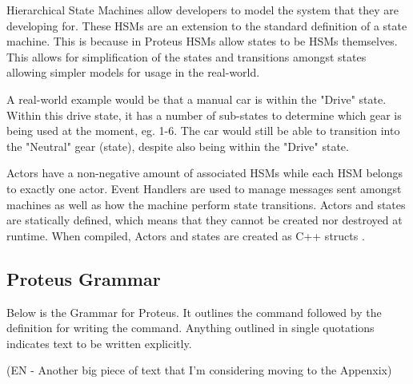 Hierarchical State Machines allow developers to model the system that they are developing for.
These HSMs are an extension to the standard definition of a state machine.
This is because in Proteus HSMs allow states to be HSMs themselves.
This allows for simplification of the states and transitions amongst states allowing simpler models for usage in the real-world.

A real-world example would be that a manual car is within the "Drive" state.
Within this drive state, it has a number of sub-states to determine which gear is being used at the moment, eg. 1-6.
The car would still be able to transition into the "Neutral" gear (state), despite also being within the "Drive" state.

Actors have a non-negative amount of associated HSMs while each HSM belongs to exactly one actor.
Event Handlers are used to manage messages sent amongst machines as well as how the machine perform state transitions.
Actors and states are statically defined, which means that they cannot be created nor destroyed at runtime.
When compiled, Actors and states are created as C++ structs \cite{ProteusRunTime}.

\subsection{Proteus Grammar}\label{subsec:ProteusGrammar}

Below is the Grammar for Proteus.
It outlines the command followed by the definition for writing the command.
Anything outlined in single quotations indicates text to be written explicitly.

(EN - Another big piece of text that I'm considering moving to the Appenxix)

